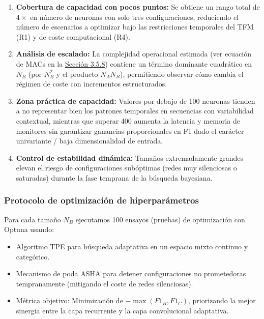 \begin{enumerate}
    \item \textbf{Cobertura de capacidad con pocos puntos:} Se obtiene un rango total de $4\times$ en número de neuronas con solo tres configuraciones, reduciendo el número de escenarios a optimizar bajo las restricciones temporales del TFM (R1) y de coste computacional (R4).
    \item \textbf{Análisis de escalado:} La complejidad operacional estimada (ver ecuación de MACs en la \hyperref[subsec:complejidad-computacional]{Sección 3.5.8}) contiene un término dominante cuadrático en $N_B$ (por $N_B^2$ y el producto $N_A N_B$), permitiendo observar cómo cambia el régimen de coste con incrementos estructurados.
    \item \textbf{Zona práctica de capacidad:} Valores por debajo de 100 neuronas tienden a no representar bien los patrones temporales en secuencias con variabilidad contextual, mientras que superar 400 aumenta la latencia y memoria de monitores sin garantizar ganancias proporcionales en F1 dado el carácter univariante / baja dimensionalidad de entrada.
    \item \textbf{Control de estabilidad dinámica:} Tamaños extremadamente grandes elevan el riesgo de configuraciones subóptimas (redes muy silenciosas o saturadas) durante la fase temprana de la búsqueda bayesiana.
\end{enumerate}

\subsubsection{Protocolo de optimización de hiperparámetros}
Para cada tamaño $N_B$ ejecutamos 100 ensayos (pruebas) de optimización con Optuna usando:
\begin{itemize}
    \item Algoritmo TPE para búsqueda adaptativa en un espacio mixto continuo y categórico.
    \item Mecanismo de poda ASHA para detener configuraciones no prometedoras tempranamente (mitigando el coste de redes silenciosas).
    \item Métrica objetivo: Minimización de $-\max(F1_B, F1_C)$, priorizando la mejor sinergia entre la capa recurrente y la capa convolucional adaptativa.
\end{itemize}


